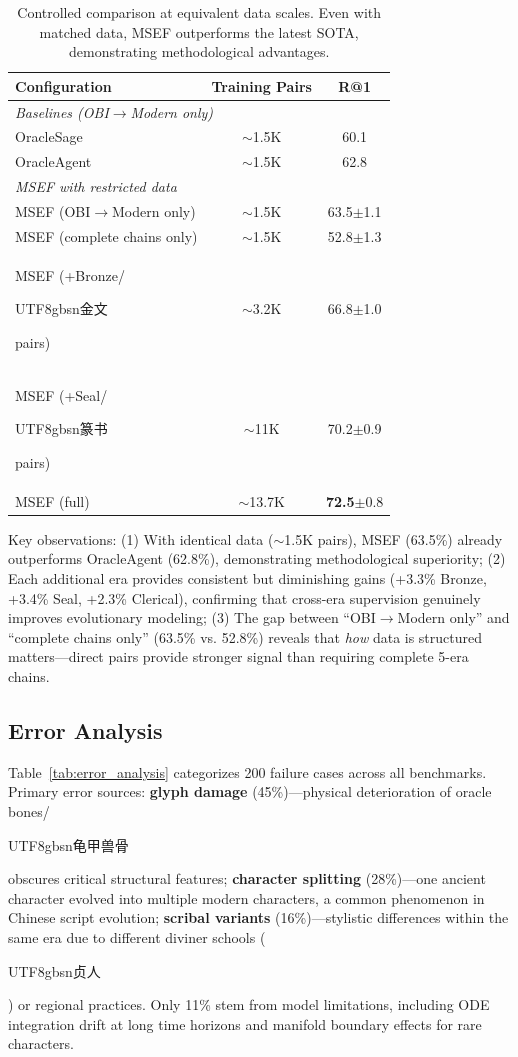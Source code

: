 \documentclass{article}
\newcommand{\cg}[1]{\begin{CJK*}{UTF8}{gbsn}#1\end{CJK*}}
\begin{document}
\begin{table}[t]
\centering
\small
\caption{Controlled comparison at equivalent data scales. Even with matched data, MSEF outperforms the latest SOTA, demonstrating methodological advantages.}
\label{tab:data_fairness}
\begin{tabular}{lcc}
\toprule
\textbf{Configuration} & \textbf{Training Pairs} & \textbf{R@1} \\
\midrule
\multicolumn{3}{l}{\textit{Baselines (OBI$\to$Modern only)}} \\
OracleSage \cite{jiang2024oraclesage} & $\sim$1.5K & 60.1 \\
OracleAgent \cite{li2025oracleagent} & $\sim$1.5K & 62.8 \\
\midrule
\multicolumn{3}{l}{\textit{MSEF with restricted data}} \\
MSEF (OBI$\to$Modern only) & $\sim$1.5K & 63.5{\scriptsize$\pm$1.1} \\
MSEF (complete chains only) & $\sim$1.5K & 52.8{\scriptsize$\pm$1.3} \\
MSEF (+Bronze/\cg{金文} pairs) & $\sim$3.2K & 66.8{\scriptsize$\pm$1.0} \\
MSEF (+Seal/\cg{篆书} pairs) & $\sim$11K & 70.2{\scriptsize$\pm$0.9} \\
\rowcolor{gray!10}
MSEF (full) & $\sim$13.7K & \textbf{72.5}{\scriptsize$\pm$0.8} \\
\bottomrule
\end{tabular}
\end{table}

Key observations: (1) With identical data ($\sim$1.5K pairs), MSEF (63.5\%) already outperforms OracleAgent (62.8\%), demonstrating methodological superiority; (2) Each additional era provides consistent but diminishing gains (+3.3\% Bronze, +3.4\% Seal, +2.3\% Clerical), confirming that cross-era supervision genuinely improves evolutionary modeling; (3) The gap between ``OBI$\to$Modern only'' and ``complete chains only'' (63.5\% vs. 52.8\%) reveals that \textit{how} data is structured matters---direct pairs provide stronger signal than requiring complete 5-era chains.







\subsection{Error Analysis}
\label{app:error_analysis}
Table~\ref{tab:error_analysis} categorizes 200 failure cases across all benchmarks. Primary error sources: \textbf{glyph damage} (45\%)---physical deterioration of oracle bones/\cg{龟甲兽骨} obscures critical structural features; \textbf{character splitting} (28\%)---one ancient character evolved into multiple modern characters, a common phenomenon in Chinese script evolution; \textbf{scribal variants} (16\%)---stylistic differences within the same era due to different diviner schools (\cg{贞人}) or regional practices. Only 11\% stem from model limitations, including ODE integration drift at long time horizons and manifold boundary effects for rare characters.
\end{document}
